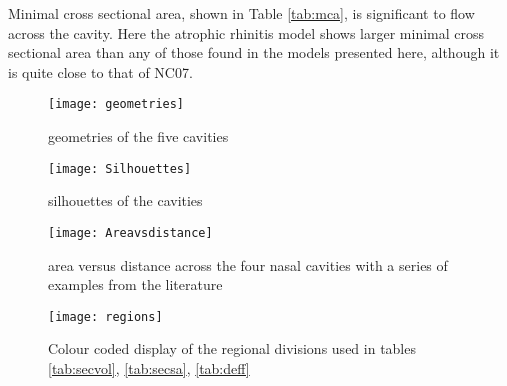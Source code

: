 Minimal cross sectional area, shown in Table \ref{tab:mca}, is significant to flow across the cavity\cite{Lindemann2008}. Here the atrophic rhinitis model shows larger minimal cross sectional area than any of those found in the models presented here, although it is quite close to that of NC07.


\begin{figure} \label{fig:geo}
  \texttt{[image: geometries]}
  \caption{geometries of the five cavities}
\end{figure}

\begin{figure} 
  \texttt{[image: Silhouettes]}
  \caption{silhouettes of the cavities}
  \label{fig:sil}

\end{figure}

\begin{figure}
  \texttt{[image: Areavsdistance]}
  \caption{area versus distance across the four nasal cavities with a series of examples from the literature}
  \label{fig:area}
\end{figure}

\begin{figure}
\centering
\texttt{[image: regions]}
\caption{Colour coded display of the regional divisions used in tables \ref{tab:secvol}, \ref{tab:secsa}, \ref{tab:deff}} \label{fig:regions}
\end{figure}

